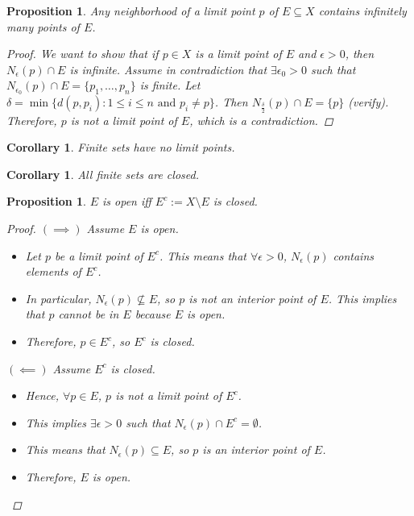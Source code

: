 \documentclass[10pt]{article}
\newtheorem{corollary}[theorem]{Corollary}
\newtheorem{proposition}[theorem]{Proposition}
\theoremstyle{definition}
\theoremstyle{remark}
\begin{document}
\begin{proposition}
    Any neighborhood of a limit point $p$ of $E \subseteq X$ contains infinitely many points of $E$.
    \begin{proof}
        We want to show that if $p \in X$ is a limit point of $E$ and $\epsilon > 0$, then $N_\epsilon(p) \cap E$ is infinite.
        Assume in contradiction that $\exists \epsilon_0 > 0$ such that $N_{\epsilon_0}(p) \cap E = \{p_1, \ldots, p_n\}$ is finite.
        Let $\delta = \min\{d(p, p_i) : 1 \leq i \leq n \text{ and } p_i \neq p\}$. Then $N_\frac{\delta}{2}(p) \cap E = \{p\}$ (verify).
        Therefore, $p$ is not a limit point of $E$, which is a contradiction.
    \end{proof}
\end{proposition}

\begin{corollary}
    Finite sets have no limit points.
\end{corollary}

\begin{corollary}
    All finite sets are closed.
\end{corollary}

\begin{proposition}
    $E$ is open iff $E^c := X \setminus E$ is closed.
    \begin{proof}
        $(\implies)$ Assume $E$ is open.

        \begin{itemize}
            \item Let $p$ be a limit point of $E^c$. This means that $\forall \epsilon > 0$, $N_\epsilon(p)$ contains elements of $E^c$.
            \item In particular, $N_\epsilon(p) \not\subseteq E$, so $p$ is not an interior point of $E$. This implies that $p$ cannot be in $E$ because $E$ is open.
            \item Therefore, $p \in E^c$, so $E^c$ is closed.
        \end{itemize}

        $(\impliedby)$ Assume $E^c$ is closed.
        \begin{itemize}
            \item Hence, $\forall p \in E$, $p$ is not a limit point of $E^c$.
            \item This implies $\exists \epsilon > 0$ such that $N_\epsilon(p) \cap E^c = \emptyset$.
            \item This means that $N_\epsilon(p) \subseteq E$, so $p$ is an interior point of $E$.
            \item Therefore, $E$ is open.
        \end{itemize}
    \end{proof}
\end{proposition}
\end{document}
